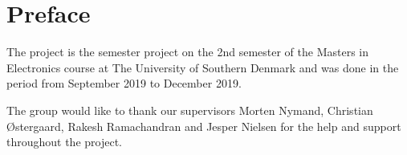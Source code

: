 \section{Preface}
The project is the semester project on the 2nd semester of the Masters in Electronics course at The University of Southern Denmark and was done in the period from September 2019 to December 2019.


The group would like to thank our supervisors Morten Nymand, Christian Østergaard, Rakesh Ramachandran and Jesper Nielsen for the help and support throughout the project. 